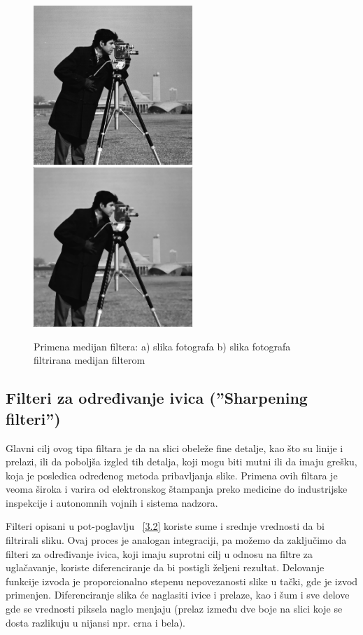 \documentclass[a4paper,12pt,titlepage]{article}
\begin{document}
\begin{figure}[ht!]
\centering
\includegraphics[width=60mm]{img/img.png}
\includegraphics[width=60mm]{img/imgMed.png}
\caption{Primena medijan filtera: a) slika fotografa b) slika fotografa filtrirana medijan filterom}
\label{medijan}
\end{figure}

\subsection{Filteri za određivanje ivica (''Sharpening filteri'')}%

Glavni cilj ovog tipa filtara je da na slici obeleže fine detalje, kao što su linije i prelazi, ili da poboljša izgled tih detalja, koji mogu biti mutni ili da imaju grešku, koja je posledica određenog metoda pribavljanja slike. Primena ovih filtara je veoma široka i varira od elektronskog štampanja preko medicine do industrijske inspekcije i autonomnih vojnih i sistema nadzora. 

Filteri opisani u pot-poglavlju ~\ref{3.2} koriste sume i srednje vrednosti da bi filtrirali sliku. Ovaj proces je analogan integraciji, pa možemo da zaključimo da filteri za određivanje ivica, koji imaju suprotni cilj u odnosu na filtre za uglačavanje, koriste diferenciranje da bi postigli željeni rezultat. Delovanje funkcije izvoda je proporcionalno stepenu nepovezanosti slike u tački, gde je izvod primenjen. Diferenciranje slika će naglasiti ivice i prelaze, kao i šum i sve delove gde se vrednosti piksela naglo menjaju (prelaz između dve boje na slici koje se dosta razlikuju u nijansi npr. crna i bela).
\end{document}
